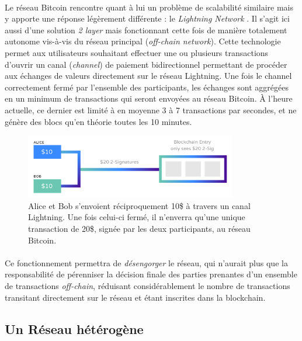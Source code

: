 \paragraph{} Le réseau Bitcoin rencontre quant à lui un problème de scalabilité similaire mais y apporte une réponse légèrement
différente : le \emph{Lightning Network} \cite{Blockchain2}. Il s'agit ici aussi d'une solution \emph{2 layer} mais
fonctionnant cette fois de manière totalement autonome vis-à-vis du réseau principal (\emph{off-chain network}). Cette 
technologie permet aux utilisateurs souhaitant effectuer une ou plusieurs transactions d'ouvrir un canal (\emph{channel})
de paiement bidirectionnel permettant de procéder aux échanges de valeurs directement sur le réseau Lightning. Une fois
le channel correctement fermé par l'ensemble des participants, les échanges sont aggrégées en un minimum de transactions
qui seront envoyées au réseau Bitcoin. À l'heure actuelle, ce dernier est limité à en moyenne 3 à 7 transactions par secondes,
et ne génère des blocs qu'en théorie toutes les 10 minutes.

\begin{figure}[ht]
    \centering
    \includegraphics[width=350px]{chapters/02/images/lightning_network.png}
    \caption{\label{lightning_network}Alice et Bob s'envoient réciproquement 10\$ à travers un canal Lightning. Une fois
    celui-ci fermé, il n'enverra qu'une unique transaction de 20\$, signée par les deux participants, au réseau Bitcoin.}
\end{figure}

\paragraph{} Ce fonctionnement permettra de \emph{désengorger} le réseau, qui n'aurait plus que la responsabilité de pérenniser
la décision finale des parties prenantes d'un ensemble de transactions \emph{off-chain}, réduisant considérablement le nombre
de transactions transitant directement sur le réseau et étant inscrites dans la blockchain.


\subsection*{Un Réseau hétérogène}

